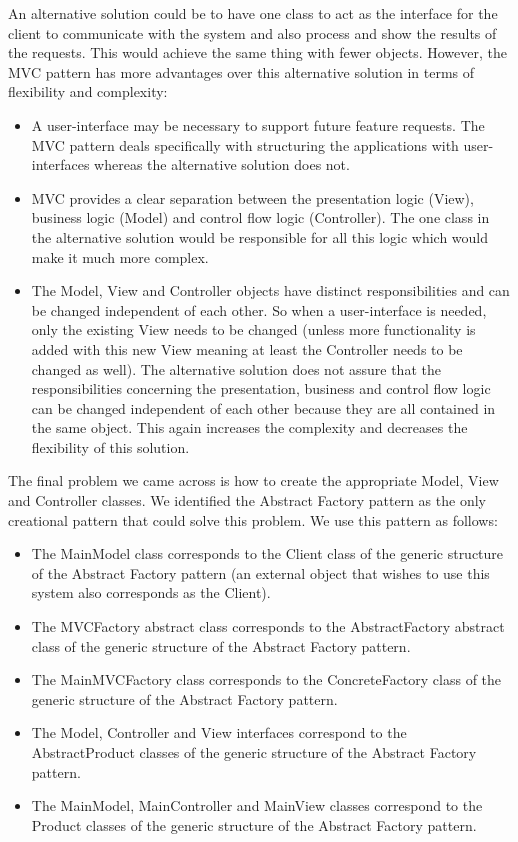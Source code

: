 \documentclass[a4paper]{article}
\begin{document}
An alternative solution could be to have one class to act as the interface for the client to communicate with the system and also process and show the results of the requests. This would achieve the same thing with fewer objects. However, the MVC pattern has more advantages over this alternative solution in terms of flexibility and complexity:

\begin{itemize}
	\item A user-interface may be necessary to support future feature requests. The MVC pattern deals specifically with structuring the applications with user-interfaces whereas the alternative solution does not.
	\item MVC provides a clear separation between the presentation logic (View), business logic (Model) and control flow logic (Controller). The one class in the alternative solution would be responsible for all this logic which would make it much more complex.
	\item The Model, View and Controller objects have distinct responsibilities and can be changed independent of each other. So when a user-interface is needed, only the existing View needs to be changed (unless more functionality is added with this new View meaning at least the Controller needs to be changed as well). The alternative solution does not assure that the responsibilities concerning the presentation, business and control flow logic can be changed independent of each other because they are all contained in the same object. This again increases the complexity and decreases the flexibility of this solution.
\end{itemize}

The final problem we came across is how to create the appropriate Model, View and Controller classes. We identified the Abstract Factory pattern as the only creational pattern that could solve this problem. We use this pattern as follows:

\begin{itemize}
	\item The MainModel class corresponds to the Client class of the generic structure of the Abstract Factory pattern (an external object that wishes to use this system also corresponds as the Client).
	\item The MVCFactory abstract class corresponds to the AbstractFactory abstract class of the generic structure of the Abstract Factory pattern.
	\item The MainMVCFactory class corresponds to the ConcreteFactory class of the generic structure of the Abstract Factory pattern.
	\item The Model, Controller and View interfaces correspond to the AbstractProduct classes of the generic structure of the Abstract Factory pattern.
	\item The MainModel, MainController and MainView classes correspond to the Product classes of the generic structure of the Abstract Factory pattern.
\end{itemize}
\end{document}
